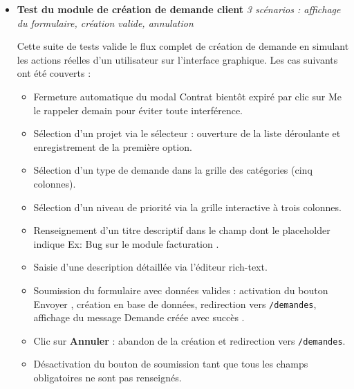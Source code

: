 \begin{itemize}[leftmargin=0pt]

\item[$\square$] \textbf{Test du module de création de demande client}
\newline \textit{3 scénarios : affichage du formulaire, création valide, annulation}

\noindent Cette suite de tests valide le flux complet de création de
demande en simulant les actions réelles d'un utilisateur sur
l'interface graphique. Les cas suivants ont été couverts :

\begin{itemize}[label=$\bullet$, nosep, itemsep=2pt]
  
  \item Fermeture automatique du modal \og Contrat bientôt expiré \fg{} par clic sur \og Me le rappeler demain \fg{} pour éviter toute interférence.
  
  \item Sélection d'un projet via le sélecteur : ouverture de la liste déroulante et enregistrement de la première option.
  
  \item Sélection d'un type de demande dans la grille des catégories (cinq colonnes).
  
  \item Sélection d'un niveau de priorité via la grille interactive à trois colonnes.
  
  \item Renseignement d'un titre descriptif dans le champ dont le placeholder indique \og Ex: Bug sur le module facturation \fg{}.
  
  \item Saisie d'une description détaillée via l'éditeur rich-text.
  
  \item Soumission du formulaire avec données valides : activation du bouton \og Envoyer \fg{}, création en base de données, redirection vers \texttt{/demandes}, affichage du message \og Demande créée avec succès \fg{}.
  
  \item Clic sur \textbf{Annuler} : abandon de la création et redirection vers \texttt{/demandes}.
  
  \item Désactivation du bouton de soumission tant que tous les champs obligatoires ne sont pas renseignés.
  
\end{itemize}


\end{itemize}
